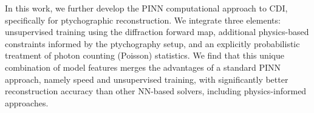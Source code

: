 \documentclass[sn-mathphys]{sn-jnl}%
\theoremstyle{thmstyleone}%
\theoremstyle{thmstyletwo}%
\theoremstyle{thmstylethree}%
\begin{document}
In this work, we further develop the PINN computational approach to CDI, specifically for ptychographic reconstruction. We integrate three elements: unsupervised training using the diffraction forward map, additional physics-based constraints informed by the ptychography setup, and an explicitly probabilistic treatment of photon counting (Poisson) statistics. We find that this unique combination of model features merges the advantages of a standard PINN approach, namely speed and unsupervised training, with significantly better reconstruction accuracy than other NN-based solvers, including physics-informed approaches.

%
\end{document}

